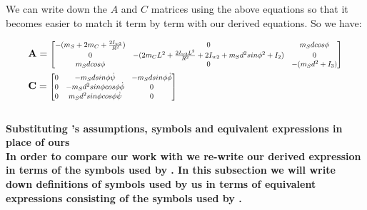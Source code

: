 \documentclass[a4paper,10pt]{article}
\newcommand\scalemath[2]{\scalebox{#1}{\mbox{\ensuremath{\displaystyle #2}}}}
\begin{document}
We can write down the $A$ and $C$ matrices using the above equations so that it becomes easier to match it 
term by term with our derived equations. So we have:

\begin{align} \begin{split}
 &\mathbf{A} = \scalemath{0.75}{\left[ \begin{matrix} -(m_S + 2m_C + \frac{2I_{w3}}{R^2}) & 0 & m_Sdcos\phi \\ 
   0 & -(2m_CL^2 +\frac{2I_{w3}L^2}{R^2} + 2I_{w2} + m_Sd^2sin\phi^2 + I_2 ) & 0 \\
   m_Sdcos\phi & 0  & -(m_Sd^2 + I_3) \end{matrix} \right]} \\
 &\mathbf{C} = \scalemath{0.75}{\left[ \begin{matrix} 0 & - m_Sdsin\phi\dot{\psi} & - m_Sdsin\phi\dot{\phi} \\ 
     0 & - m_Sd^2sin\phi cos\phi\dot{\phi} & 0 \\ 
    0 & m_Sd^2sin\phi cos\phi\dot{\psi} & 0 \end{matrix} \right]} \label{kimAC}
\end{split} \end{align}
\\
\bf{Substituting \cite{kim2005dynamic}'s assumptions, symbols and equivalent expressions in place of ours}
\normalfont\\
In order to compare our work with \cite{kim2005dynamic} we re-write our derived expression in terms of the
symbols used by \cite{kim2005dynamic}. In this subsection we will write down definitions of symbols used by
us in terms of equivalent expressions consisting of the symbols used by \cite{kim2005dynamic}. 
\end{document}
